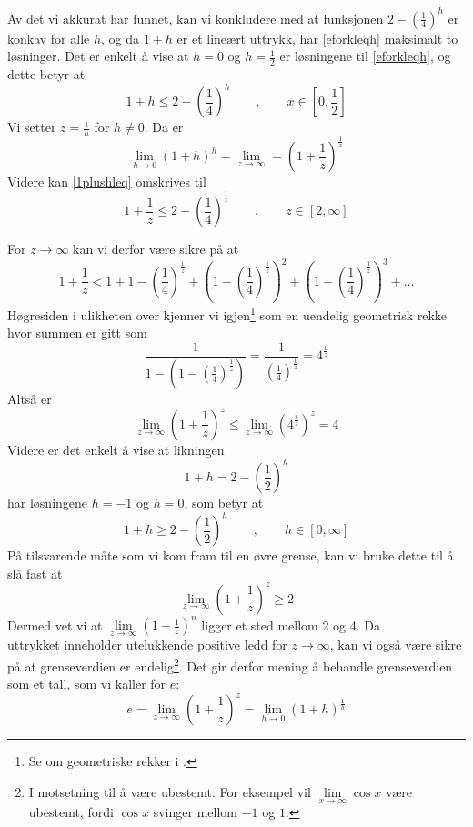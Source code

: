 \newpage
Av det vi akkurat har funnet, kan vi konkludere med at funksjonen $2-\left(\frac{1}{4}\right)^h $ er konkav for alle $ h $, og da $ 1+h$ er et lineært uttrykk, har \eqref{eforkleqh} maksimalt to løsninger. Det er enkelt å vise at $ h=0 $ og $ h=\frac{1}{2} $ er løsningene til \eqref{eforkleqh}, og dette betyr at
\begin{equation}\label{1plushleq}
1+h\leq 2-\left(\frac{1}{4}\right)^h\qquad,\qquad x\in\left[0, \frac{1}{2}\right] 	
\end{equation}
Vi setter $z=\frac{1}{h} $ for $ h\neq0 $. Da er
\[ \lim\limits_{h\to 0} (1+h)^h=\lim\limits_{z\to\infty}=\left(1+\frac{1}{z}\right)^\frac{1}{z} \]
Videre kan \eqref{1plushleq} omskrives til
\begin{equation}\label{eforkleqz}
	1+\frac{1}{z}\leq 2-\left(\frac{1}{4}\right)^\frac{1}{z}\qquad,\qquad z\in[2, \infty]
\end{equation}

For $ z\to\infty $ kan vi derfor være sikre på at
\[ 1+\frac{1}{z}<1+1-\left(\frac{1}{4}\right)^\frac{1}{z}+\left(1-\left(\frac{1}{4}\right)^\frac{1}{z}\right)^2+\left(1-\left(\frac{1}{4}\right)^\frac{1}{z}\right)^3+... \]
Høgresiden i ulikheten over kjenner vi igjen\footnote{Se om geometriske rekker i \tmto.} som en uendelig geometrisk rekke hvor summen er gitt som
\[ \frac{1}{1-\left(1-\left(\frac{1}{4}\right)^\frac{1}{z}\right)} =\frac{1}{\left(\frac{1}{4}\right)^\frac{1}{z}}=4^\frac{1}{z} \]
Altså er
\begin{equation}\label{eforkllim4}
	\lim\limits_{z\to\infty}\left(1+\frac{1}{z}\right)^z\leq \lim\limits_{z\to\infty}\left(4^\frac{1}{z}\right)^z=4
\end{equation}
\newpage
Videre er det enkelt å vise at likningen
\[ 1+h=2-\left(\frac{1}{2}\right)^h \]
har løsningene $ h=-1 $ og $ h=0 $, som betyr at
\[ 1+h\geq2-\left(\frac{1}{2}\right)^h \qquad,\qquad h\in[0, \infty]\]
På tilsvarende måte som vi kom fram til en øvre grense, kan vi bruke dette til å slå fast at
\[ \lim\limits_{z\to \infty}\left(1 + \frac{1}{z}\right)^z\geq 2 \] 
Dermed vet vi at $ \lim\limits_{z\to\infty }\left(1+\frac{1}{z}\right)^n $ ligger et sted mellom 2 og 4. Da\\ uttrykket inneholder utelukkende positive ledd for $ {z\to\infty} $, kan vi også være sikre på at grenseverdien er endelig\footnote{I motsetning til å være ubestemt. For eksempel vil $ \lim\limits_{x\to \infty} \cos x $  være ubestemt, fordi $ \cos x $ svinger mellom $ -1 $ og $ 1 $.}. Det gir derfor mening å behandle grenseverdien som et tall, som vi kaller for $ e $:
\[ e=\lim\limits_{z\to\infty }\left(1+\frac{1}{z}\right)^z=\lim\limits_{h\to0}\left(1+h\right)^{\frac{1}{h}}  \]
